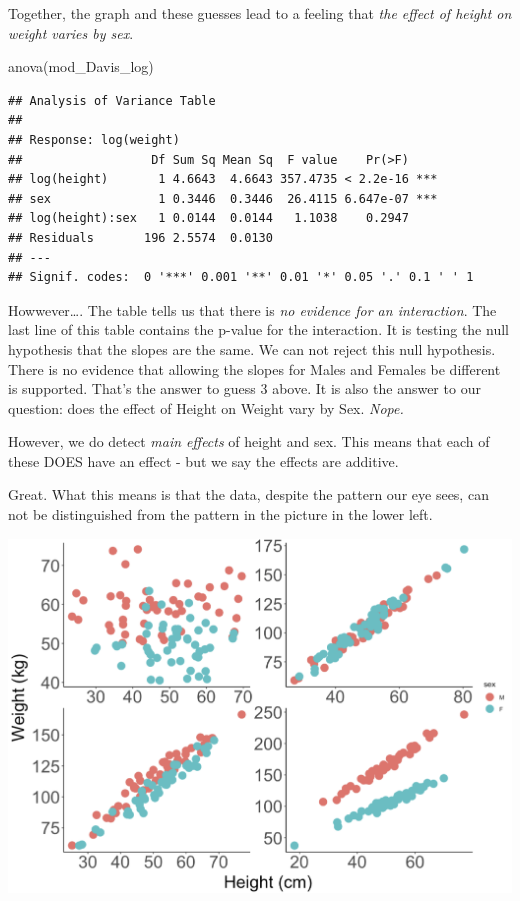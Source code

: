 \documentclass[
]{book}
\newenvironment{Shaded}{\begin{snugshade}}{\end{snugshade}}
\newcommand{\FunctionTok}[1]{\textcolor[rgb]{0.00,0.00,0.00}{#1}}
\newcommand{\NormalTok}[1]{#1}
\begin{document}
Together, the graph and these guesses lead to a feeling that \emph{the effect of height on weight varies by sex}.

\begin{Shaded}
\begin{Highlighting}[]
\FunctionTok{anova}\NormalTok{(mod\_Davis\_log)}
\end{Highlighting}
\end{Shaded}

\begin{verbatim}
## Analysis of Variance Table
## 
## Response: log(weight)
##                  Df Sum Sq Mean Sq  F value    Pr(>F)    
## log(height)       1 4.6643  4.6643 357.4735 < 2.2e-16 ***
## sex               1 0.3446  0.3446  26.4115 6.647e-07 ***
## log(height):sex   1 0.0144  0.0144   1.1038    0.2947    
## Residuals       196 2.5574  0.0130                       
## ---
## Signif. codes:  0 '***' 0.001 '**' 0.01 '*' 0.05 '.' 0.1 ' ' 1
\end{verbatim}

Howwever\ldots. The table tells us that there is \emph{no evidence for an interaction}. The last line of this table contains the p-value for the interaction. It is testing the null hypothesis that the slopes are the same. We can not reject this null hypothesis. There is no evidence that allowing the slopes for Males and Females be different is supported. That's the answer to guess 3 above. It is also the answer to our question: does the effect of Height on Weight vary by Sex. \emph{Nope.}

However, we do detect \emph{main effects} of height and sex. This means that each of these DOES have an effect - but we say the effects are additive.

Great. What this means is that the data, despite the pattern our eye sees, can not be distinguished from the pattern in the picture in the lower left.

\includegraphics[width=17.89in]{images/ANCOVA_1}
\end{document}
